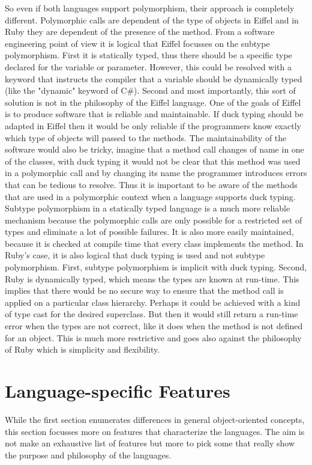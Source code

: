 \documentclass[12pt,a4paper,twocolumn]{article}
\begin{document}
So even if both languages support polymorphism, their approach is completely different. Polymorphic calls are dependent of the type of objects in Eiffel and in Ruby they are dependent of the presence of the method. From a software engineering point of view it is logical that Eiffel focusses on the subtype polymorphism. First it is statically typed, thus there should be a specific type declared for the variable or parameter. However, this could be resolved with a keyword that instructs the compiler that a variable should be dynamically typed (like the "dynamic" keyword of C\#). Second and most importantly, this sort of solution is not in the philosophy of the Eiffel language. One of the goals of Eiffel is to produce software that is reliable and maintainable. If duck typing should be adapted in Eiffel then it would be only reliable if the programmers know exactly which type of objects will passed to the methods. The maintainability of the software would also be tricky, imagine that a method call changes of name in one of the classes, with duck typing it would not be clear that this method was used in a polymorphic call and by changing its name the programmer introduces errors that can be tedious to resolve. Thus it is important to be aware of the methods that are used in a polymorphic context when a language supports duck typing. Subtype polymorphism in a statically typed language is a much more reliable mechanism because the polymorphic calls are only possible for a restricted set of types and eliminate a lot of possible failures. It is also more easily maintained, because it is checked at compile time that every class implements the method. In Ruby's case, it is also logical that duck typing is used and not subtype polymorphism. First, subtype polymorphism is implicit with duck typing. Second, Ruby is dynamically typed, which means the types are known at run-time. This implies that there would be no secure way to ensure that the method call is applied on a particular class hierarchy. Perhaps it could be achieved with a kind of type cast for the desired superclass. But then it would still return a run-time error when the types are not correct, like it does when the method is not defined for an object. This is much more restrictive and goes also against the philosophy of Ruby which is simplicity and flexibility.
\section{Language-specific Features}
While the first section enumerates differences in general object-oriented concepts, this section focusses more on features that characterize the languages. The aim is not make an exhaustive list of features but more to pick some that really show the purpose and philosophy of the languages.
\end{document}
